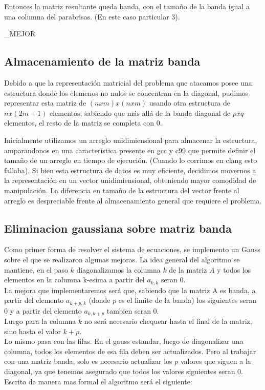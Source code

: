 Entonces la matriz resultante queda banda, con el tamaño de la banda igual a una columna del parabrisas. (En este caso particular 3).

\EXPLICAR_MEJOR


\subsection{Almacenamiento de la matriz banda}

Debido a que la representaci\'on matricial del problema que atacamos posee una estructura donde los elemenos no nulos se concentran en la diagonal, pudimos representar esta matriz de $(nxm)x(nxm)$ usando otra estructura de $nx(2m+1)$ elementos, sabiendo que m\'as all\'a de la banda diagonal de $pxq$ elementos, el resto de la matriz se completa con 0.

Inicialmente utilizamos un arreglo unidimiensional para almacenar la estructura, amparandonos en una caracter\'istica presente en gcc y c99 que permite definir el tama\~no de un arreglo en tiempo de ejecuci\'on. (Cuando lo corrimos en clang esto fallaba).
Si bien esta estructura de datos es muy eficiente, decidimos movernos a la representaci\'on en un vector unidimiensional, obteniendo mayor comodidad de manipulaci\'on. La diferencia en tama\~no de la estructura del vector frente al arreglo es despreciable frente al almacenamiento general que requiere el problema.


\subsection{Eliminacion gaussiana sobre matriz banda}

Como primer forma de resolver el sistema de ecuaciones, se implemento un Gauss sobre el que se realizaron algunas mejoras. La idea general del algoritmo se mantiene, en el paso $k$ diagonalizamos la columna $k$ de la matriz $A$ y todos los elementos en la columna k-esima a partir del $a_{k,k}$ seran $0$.
\\
La mejora que implementaremos ser\'a que, sabiendo que la matriz A es banda, a partir del elemento $a_{k+p,k}$ (donde $p$ es el limite de la banda) los siguientes seran $0$ y a partir del elemento $a_{k,k+p}$ tambien seran $0$.
\\
Luego para la columna $k$ no ser\'a necesario chequear hasta el final de la matriz, sino hasta el valor $k+p$.
\\
Lo mismo pasa con las filas. En el gauss estandar, luego de diagonalizar una columna, todos los elementos de esa fila deben ser actualizados. Pero al trabajar con una matriz banda, solo es necesario actualizar los $p$ valores que siguen a la diagonal, ya que tenemos asegurado que todos los valores siguientes seran $0$.
\\
Escrito de manera mas formal el algoritmo ser\'a el siguiente:

